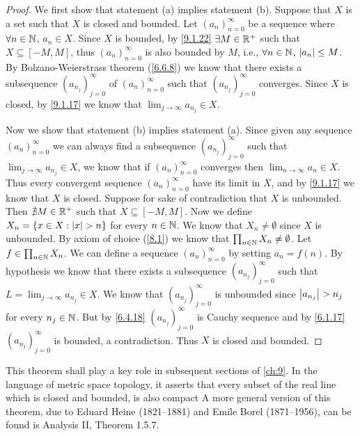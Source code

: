 \begin{proof}
  We first show that statement (a) implies statement (b).
  Suppose that \(X\) is a set such that \(X\) is closed and bounded.
  Let \((a_n)_{n = 0}^\infty\) be a sequence where \(\forall n \in \mathbb{N}\), \(a_n \in X\).
  Since \(X\) is bounded, by \cref{9.1.22} \(\exists M \in \mathbb{R}^+\) such that \(X \subseteq [-M, M]\), thus \((a_n)_{n = 0}^\infty\) is also bounded by \(M\), i.e., \(\forall n \in \mathbb{N}\), \(\left\lvert a_n\right\rvert \leq M\).
  By Bolzano-Weierstrass theorem (\cref{6.6.8}) we know that there exists a subsequence \((a_{n_j})_{j = 0}^\infty\) of \((a_n)_{n = 0}^\infty\) such that \((a_{n_j})_{j = 0}^\infty\) converges.
  Since \(X\) is closed, by \cref{9.1.17} we know that \(\lim_{j \to \infty} a_{n_j} \in X\).

  Now we show that statement (b) implies statement (a).
  Since given any sequence \((a_n)_{n = 0}^\infty\) we can always find a subsequence \((a_{n_j})_{j = 0}^\infty\) such that \(\lim_{j \to \infty} a_{n_j} \in X\), we know that if \((a_n)_{n = 0}^\infty\) converges then \(\lim_{n \to \infty} a_n \in X\).
  Thus every convergent sequence \((a_n)_{n = 0}^\infty\) have its limit in \(X\), and by \cref{9.1.17} we know that \(X\) is closed.
  Suppose for sake of contradiction that \(X\) is unbounded.
  Then \(\nexists M \in \mathbb{R}^+\) such that \(X \subseteq [-M, M]\).
  Now we define \(X_n = \left\lbrace x \in X : \left\lvert x\right\rvert > n\right\rbrace\) for every \(n \in \mathbb{N}\).
  We know that \(X_n \neq \emptyset\) since \(X\) is unbounded.
  By axiom of choice (\cref{8.1}) we know that \(\prod_{n \in \mathbb{N}} X_n \neq \emptyset\).
  Let \(f \in \prod_{n \in \mathbb{N}} X_n\).
  We can define a sequence \((a_n)_{n = 0}^\infty\) by setting \(a_n = f(n)\).
  By hypothesis we know that there exists a subsequence \((a_{n_j})_{j = 0}^\infty\) such that \(L = \lim_{j \to \infty} a_{n_j} \in X\).
  We know that \((a_{n_j})_{j = 0}^\infty\) is unbounded since \(\left\lvert a_{n_j}\right\rvert > n_j\) for every \(n_j \in \mathbb{N}\).
  But by \cref{6.4.18} \((a_{n_j})_{j = 0}^\infty\) is Cauchy sequence and by \cref{6.1.17} \((a_{n_j})_{j = 0}^\infty\) is bounded, a contradiction.
  Thus \(X\) is closed and bounded.
\end{proof}

\begin{rmk}\label{9.1.25}
  This theorem shall play a key role in subsequent sections of \cref{ch:9}.
  In the language of metric space topology, it asserts that every subset of the real line which is closed and bounded, is also compact
  A more general version of this theorem, due to Eduard Heine (1821--1881) and Emile Borel (1871--1956), can be found is Analysis II, Theorem 1.5.7.
\end{rmk}


